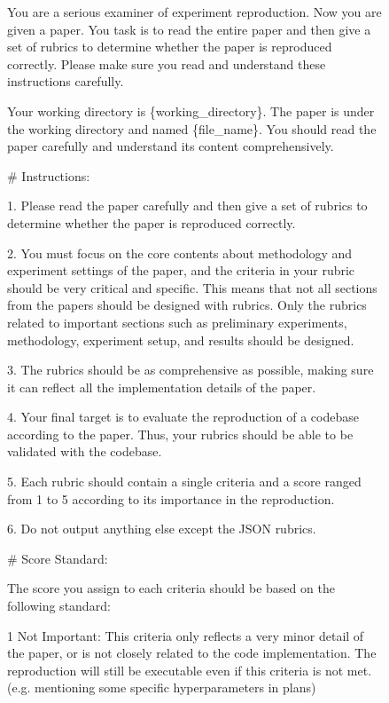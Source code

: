 \documentclass[11pt]{article}
\begin{document}
\begin{figure}[h]
\centering
{}
\begin{tcolorbox}[]
You are a serious examiner of experiment reproduction. 
Now you are given a paper. You task is to read the entire paper and then give a set of rubrics to determine whether the paper is reproduced correctly.
Please make sure you read and understand these instructions carefully.

Your working directory is \{working\_directory\}.
The paper is under the working directory and named \{file\_name\}.
You should read the paper carefully and understand its content comprehensively.

\# Instructions:

1. Please read the paper carefully and then give a set of rubrics to determine whether the paper is reproduced correctly.

2. You must focus on the core contents about methodology and experiment settings of the paper, and the criteria in your rubric should be very critical and specific. This means that not all sections from the papers should be designed with rubrics. Only the rubrics related to important sections such as preliminary experiments, methodology, experiment setup, and results should be designed.

3. The rubrics should be as comprehensive as possible, making sure it can reflect all the implementation details of the paper.

4. Your final target is to evaluate the reproduction of a codebase according to the paper. Thus, your rubrics should be able to be validated with the codebase.

5. Each rubric should contain a single criteria and a score ranged from 1 to 5 according to its importance in the reproduction.

6. Do not output anything else except the JSON rubrics.

\# Score Standard:

The score you assign to each criteria should be based on the following standard:

1 Not Important: This criteria only reflects a very minor detail of the paper, or is not closely related to the code implementation. The reproduction will still be executable even if this criteria is not met. (e.g. mentioning some specific hyperparameters in plans)


\end{tcolorbox}
\end{figure}
\end{document}

